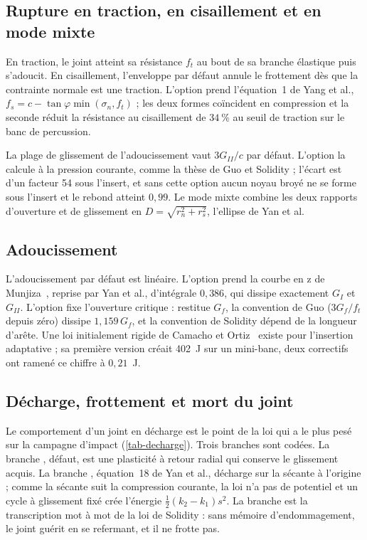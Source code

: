\subsection{Rupture en traction, en cisaillement et en mode mixte}

En traction, le joint atteint sa résistance $f_t$ au bout de sa branche élastique puis s'adoucit. En cisaillement, l'enveloppe par défaut annule le frottement dès que la contrainte normale est une traction. L'option  prend l'équation~1 de Yang et al., $f_s = c - \tan\varphi \min(\sigma_n, f_t)$ ; les deux formes coïncident en compression et la seconde réduit la résistance au cisaillement de $34~\%$ au seuil de traction sur le banc de percussion.

La plage de glissement de l'adoucissement vaut $3G_{II}/c$ par défaut. L'option  la calcule à la pression courante, comme la thèse de Guo et Solidity ; l'écart est d'un facteur 54 sous l'insert, et sans cette option aucun noyau broyé ne se forme sous l'insert et le rebond atteint $0{,}99$. Le mode mixte combine les deux rapports d'ouverture et de glissement en $D = \sqrt{r_n^2 + r_s^2}$, l'ellipse de Yan et al.

\subsection{Adoucissement}

L'adoucissement par défaut est linéaire. L'option  prend la courbe en z de Munjiza~\cite{munjiza1999smeared}, reprise par Yan et al., d'intégrale $0{,}386$, qui dissipe exactement $G_I$ et $G_{II}$. L'option  fixe l'ouverture critique :  restitue $G_f$, la convention de Guo ($3G_f/f_t$ depuis zéro) dissipe $1{,}159\,G_f$, et la convention de Solidity dépend de la longueur d'arête. Une loi initialement rigide de Camacho et Ortiz~\cite{camacho1996impact} existe pour l'insertion adaptative ; sa première version créait 402~J sur un mini-banc, deux correctifs ont ramené ce chiffre à $0{,}21$~J.

\subsection{Décharge, frottement et mort du joint}
\label{sec-decharge}

Le comportement d'un joint en décharge est le point de la loi qui a le plus pesé sur la campagne d'impact (\cref{tab-decharge}). Trois branches sont codées. La branche , défaut, est une plasticité à retour radial qui conserve le glissement acquis. La branche , équation~18 de Yan et al., décharge sur la sécante à l'origine ; comme la sécante suit la compression courante, la loi n'a pas de potentiel et un cycle à glissement fixé crée l'énergie $\frac12(k_2 - k_1)s^2$. La branche  est la transcription mot à mot de la loi de Solidity : sans mémoire d'endommagement, le joint guérit en se refermant, et il ne frotte pas.

